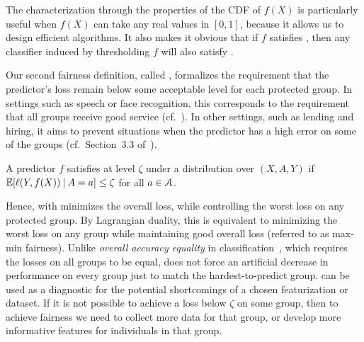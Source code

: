 \documentclass{article}
\begin{document}
The characterization through the properties of
the CDF of $f(X)$
is particularly useful when $f(X)$ can take any real values in $[0,1]$, because it allows us to design efficient algorithms.
It also makes it obvious that if $f$ satisfies \sp, then any classifier induced by thresholding $f$ will also satisfy \sp.

Our second fairness definition, called \emph{\ep}, formalizes the requirement that the predictor's loss remain below some acceptable level for each protected group. In settings such as speech or face recognition, this corresponds to the requirement that all groups receive good service (cf.~\citealp{buolamwini2018gender}). In other settings, such as lending and hiring, it aims to prevent situations when the predictor has a high error on some of the groups (cf.~Section~3.3 of~\citealp{CorbettDaviesGo18}).
%
\begin{definition}
A predictor $f$ satisfies \ep at level $\zeta$ under a distribution over $(X,A,Y)$ if $\mathbb{E}[\ell(Y,f(X))\mathbin{\vert} A=a]\le\zeta$ for all $a\in\mathcal{A}$.
\end{definition}
%
Hence, \prob with \epshort minimizes the overall loss, while controlling the worst loss on any protected group. By Lagrangian duality, this is equivalent to minimizing the worst loss on any group while maintaining good overall loss (referred to as max-min fairness).
Unlike
\emph{overall accuracy equality} in classification~\cite{dieterich2016compas}, which requires the losses
on all groups to be equal, \epshort does not force an artificial decrease in performance on every group just to match the hardest-to-predict group.
%
\epshort can be used as a diagnostic for the potential shortcomings of a chosen featurization or dataset. If it is not possible to achieve a loss below $\zeta$ on some group, then to achieve fairness we need to collect more data for that group, or develop more informative features for individuals in that group.
\end{document}
